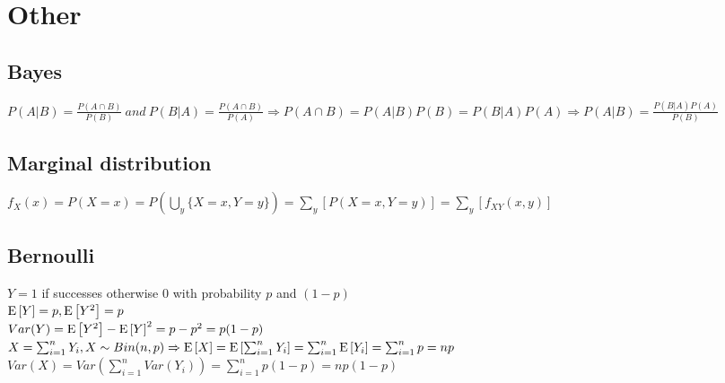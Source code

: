 \section{Other}
\subsection{Bayes}
\begin{math}
  P(A|B) = \frac{P(A\cap B)}{P(B)}\ and\ P(B|A)
         = \frac{P(A\cap B)}{P(A)}
         \Rightarrow P(A\cap B) = P(A|B)P(B) = P(B|A)P(A)
         \Rightarrow P(A|B) = \frac{P(B|A)P(A)}{P(B)}
\end{math} \\[2pt]

\subsection{Marginal distribution}
\begin{math}
  f_X(x) = P(X = x)
         = P(\bigcup_y \{X = x, Y = y\})
         = \sum_y \left[ P(X = x, Y = y) \right]
         = \sum_y \left[ f_{XY}(x, y) \right]
\end{math} \\[2pt]

\subsection{Bernoulli}
\(Y = 1\) if successes otherwise 0 with probability \(p\) and \((1 - p)\) \\[2pt]
\begin{math}
  \mathrm{E} \left[ {Y} \right] = p,
  \mathrm{E} \left[ {Y^2} \right] = p
\end{math} \\[2pt]
\begin{math}
    Var(Y) = \mathrm{E} \left[ {Y^2} \right] - \mathrm{E} \left[ {Y} \right]^2 = p - p^2 = p(1 - p)
\end{math} \\[2pt]
\begin{math}
    X = \sum_{i = 1}^n Y_i, X \sim Bin(n, p)
    \Rightarrow
    \mathrm{E} \left[ {X} \right] = \mathrm{E} \left[ {\sum_{i = 1}^n Y_i} \right]
               = \sum_{i = 1}^n \mathrm{E} \left[ {Y_i} \right]
               = \sum_{i = 1}^n p
               = np
\end{math} \\[2pt]
\begin{math}
    Var(X) = Var(\sum_{i = 1}^n Var(Y_i) )
           = \sum_{i = 1}^n p(1 - p)
           = np(1 - p)
\end{math} \\[2pt]

